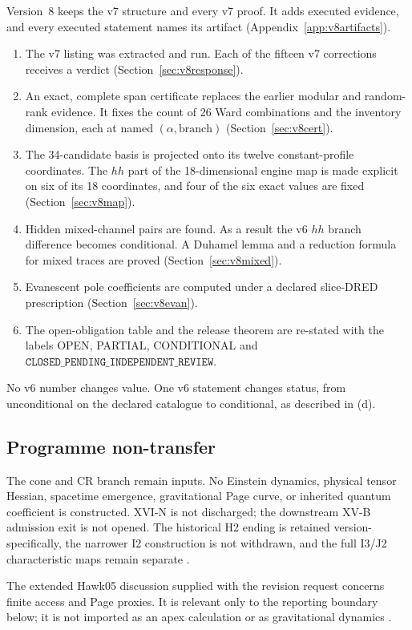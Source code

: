 \documentclass[11pt,a4paper]{article}
\newcommand{\OPEN}{\textsf{OPEN}}
\newcommand{\CONDITIONAL}{\textsf{CONDITIONAL}}
\newcommand{\PARTIAL}{\textsf{PARTIAL}}
\theoremstyle{plain}
\theoremstyle{definition}
\theoremstyle{remark}
\numberwithin{equation}{section}
\begin{document}
Version~8 keeps the v7 structure and every v7 proof. It adds
executed evidence, and every executed statement names its
artifact (Appendix~\ref{app:v8artifacts}).
\begin{enumerate}[label=\textup{(\alph*)}]
\item The v7 listing was extracted and run. Each of the fifteen
v7 corrections receives a verdict
(Section~\ref{sec:v8response}).
\item An exact, complete span certificate replaces the earlier
modular and random-rank evidence. It fixes the count of 26 Ward
combinations and the inventory dimension, each at named
\((\alpha,\text{branch})\) (Section~\ref{sec:v8cert}).
\item The 34-candidate basis is projected onto its twelve
constant-profile coordinates. The \(hh\) part of the
18-dimensional engine map is made explicit on six of its 18
coordinates, and four of the six exact values are fixed
(Section~\ref{sec:v8map}).
\item Hidden mixed-channel pairs are found. As a result the v6
\(hh\) branch difference becomes conditional. A Duhamel lemma
and a reduction formula for mixed traces are proved
(Section~\ref{sec:v8mixed}).
\item Evanescent pole coefficients are computed under a declared
slice-DRED prescription (Section~\ref{sec:v8evan}).
\item The open-obligation table and the release theorem are
re-stated with the labels \OPEN, \PARTIAL, \CONDITIONAL{} and
\(\texttt{CLOSED\_PENDING\_INDEPENDENT\_REVIEW}\).
\end{enumerate}
No v6 number changes value. One v6 statement changes status, from
unconditional on the declared catalogue to conditional, as
described in (d).

\subsection{Programme non-transfer}

The cone and CR branch remain inputs. No Einstein dynamics,
physical tensor Hessian, spacetime emergence, gravitational Page
curve, or inherited quantum coefficient is constructed.
XVI-N is not discharged; the downstream XV-B admission exit is
not opened. The historical H2 ending is retained
version-specifically, the narrower I2 construction is not
withdrawn, and the full I3/J2 characteristic maps remain separate
\cite{CheungN,CheungCharacteristic,CheungXVB}.

The extended Hawk05 discussion supplied with the revision request
concerns finite access and Page proxies. It is relevant only to
the reporting boundary below; it is not imported as an apex
calculation or as gravitational dynamics
\cite{CheungHawk05}.
\end{document}
